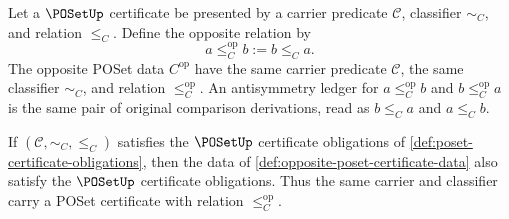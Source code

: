 \begin{definition}
\label{def:opposite-poset-certificate-data}
Let a $\POSetUp$ certificate be presented by a carrier predicate $\mathcal C$, classifier $\sim_C$, and relation $\le_C$. Define the opposite relation by
$$
a\le_C^{\mathrm{op}} b:=b\le_C a.
$$
The opposite POSet data $C^{\mathrm{op}}$ have the same carrier predicate $\mathcal C$, the same classifier $\sim_C$, and relation $\le_C^{\mathrm{op}}$. An antisymmetry ledger for $a\le_C^{\mathrm{op}} b$ and $b\le_C^{\mathrm{op}} a$ is the same pair of original comparison derivations, read as $b\le_C a$ and $a\le_C b$.
\end{definition}

\begin{theorem}
\label{thm:opposite-poset-certificate}
If $(\mathcal C,\sim_C,\le_C)$ satisfies the $\POSetUp$ certificate obligations of \autoref{def:poset-certificate-obligations}, then the data of \autoref{def:opposite-poset-certificate-data} also satisfy the $\POSetUp$ certificate obligations. Thus the same carrier and classifier carry a POSet certificate with relation $\le_C^{\mathrm{op}}$.
\end{theorem}
